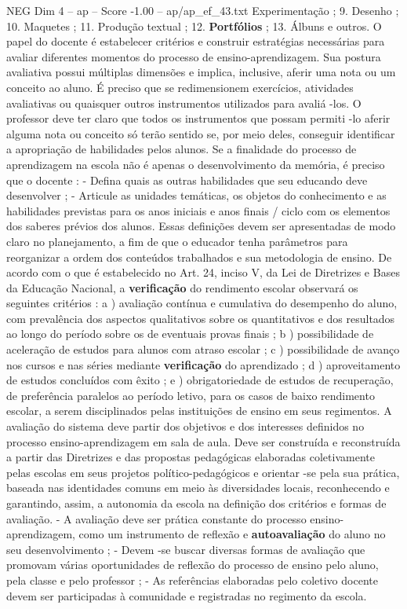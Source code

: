 \begin{textsample}{NEG Dim 4 – ap – Score -1.00 – ap/ap\_ef\_43.txt}
Experimentação ; 9.
Desenho ; 10.
Maquetes ; 11.
Produção textual ; 12. \textbf{Portfólios} ; 13.
Álbuns e outros.
O papel do docente é estabelecer critérios e construir estratégias necessárias para avaliar diferentes momentos do processo de ensino-aprendizagem.
Sua postura avaliativa possui múltiplas dimensões e implica, inclusive, aferir uma nota ou um conceito ao aluno.
É preciso que se redimensionem exercícios, atividades avaliativas ou quaisquer outros instrumentos utilizados para avaliá -los.
O professor deve ter claro que todos os instrumentos que possam permiti -lo aferir alguma nota ou conceito só terão sentido se, por meio deles, conseguir identificar a apropriação de habilidades pelos alunos.
Se a finalidade do processo de aprendizagem na escola não é apenas o desenvolvimento da memória, é preciso que o docente : - Defina quais as outras habilidades que seu educando deve desenvolver ; - Articule as unidades temáticas, os objetos do conhecimento e as habilidades previstas para os anos iniciais e anos finais / ciclo com os elementos dos saberes prévios dos alunos.
Essas definições devem ser apresentadas de modo claro no planejamento, a fim de que o educador tenha parâmetros para reorganizar a ordem dos conteúdos trabalhados e sua metodologia de ensino.
De acordo com o que é estabelecido no Art. 24, inciso V, da Lei de Diretrizes e Bases da Educação Nacional, a \textbf{verificação} do rendimento escolar observará os seguintes critérios : a ) avaliação contínua e cumulativa do desempenho do aluno, com prevalência dos aspectos qualitativos sobre os quantitativos e dos resultados ao longo do período sobre os de eventuais provas finais ; b ) possibilidade de aceleração de estudos para alunos com atraso escolar ; c ) possibilidade de avanço nos cursos e nas séries mediante \textbf{verificação} do aprendizado ; d ) aproveitamento de estudos concluídos com êxito ; e ) obrigatoriedade de estudos de recuperação, de preferência paralelos ao período letivo, para os casos de baixo rendimento escolar, a serem disciplinados pelas instituições de ensino em seus regimentos.
A avaliação do sistema deve partir dos objetivos e dos interesses definidos no processo ensino-aprendizagem em sala de aula.
Deve ser construída e reconstruída a partir das Diretrizes e das propostas pedagógicas elaboradas coletivamente pelas escolas em seus projetos político-pedagógicos e orientar -se pela sua prática, baseada nas identidades comuns em meio às diversidades locais, reconhecendo e garantindo, assim, a autonomia da escola na definição dos critérios e formas de avaliação. - A avaliação deve ser prática constante do processo ensino-aprendizagem, como um instrumento de reflexão e \textbf{autoavaliação} do aluno no seu desenvolvimento ; - Devem -se buscar diversas formas de avaliação que promovam várias oportunidades de reflexão do processo de ensino pelo aluno, pela classe e pelo professor ; - As referências elaboradas pelo coletivo docente devem ser participadas à comunidade e registradas no regimento da escola.

\end{textsample}
